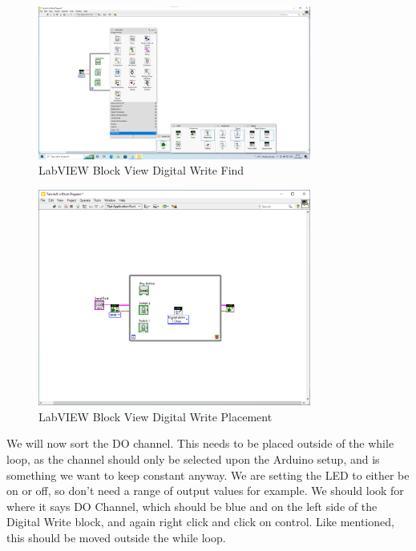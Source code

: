 \documentclass[a4paper,11pt]{report}
\begin{document}
\begin{figure}[H]
\centering
\includegraphics[width=0.8\textwidth]{screenshots/labview17}
\caption{LabVIEW Block View Digital Write Find}
\end{figure}

\begin{figure}[H]
\centering
\includegraphics[width=0.8\textwidth]{screenshots/labview19}
\caption{LabVIEW Block View Digital Write Placement}
\end{figure}

We will now sort the DO channel. This needs to be placed outside of the while loop, as the channel should only be selected upon the Arduino setup, and is something we want to keep constant anyway. We are setting the LED to either be on or off, so don't need a range of output values for example. We should look for where it says DO Channel, which should be blue and on the left side of the Digital Write block, and again right click and click on control. Like mentioned, this should be moved outside the while loop.
\end{document}

